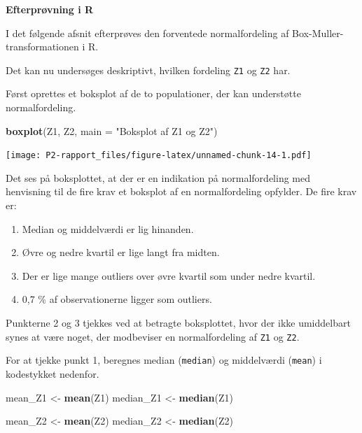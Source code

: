 \documentclass[
]{book}
\newenvironment{Shaded}{\begin{snugshade}}{\end{snugshade}}
\newcommand{\DataTypeTok}[1]{\textcolor[rgb]{0.13,0.29,0.53}{#1}}
\newcommand{\KeywordTok}[1]{\textcolor[rgb]{0.13,0.29,0.53}{\textbf{#1}}}
\newcommand{\NormalTok}[1]{#1}
\newcommand{\StringTok}[1]{\textcolor[rgb]{0.31,0.60,0.02}{#1}}
\theoremstyle{definition}
\theoremstyle{definition}
\theoremstyle{definition}
\theoremstyle{remark}
\begin{document}
\textbf{Efterprøvning i R}

I det følgende afsnit efterprøves den forventede normalfordeling af Box-Muller-transformationen i R.

Det kan nu undersøges deskriptivt, hvilken fordeling \texttt{Z1} og \texttt{Z2} har.

Først oprettes et boksplot af de to populationer, der kan understøtte normalfordeling.

\begin{Shaded}
\begin{Highlighting}[]
\KeywordTok{boxplot}\NormalTok{(Z1, Z2, }\DataTypeTok{main =} \StringTok{"Boksplot af Z1 og Z2"}\NormalTok{)}
\end{Highlighting}
\end{Shaded}

\texttt{[image: P2-rapport\_files/figure-latex/unnamed-chunk-14-1.pdf]}

Det ses på boksplottet, at der er en indikation på normalfordeling med henvisning til de fire krav et boksplot af en normalfordeling opfylder. De fire krav er:

\begin{enumerate}
\def\labelenumi{\arabic{enumi})}
\item
  Median og middelværdi er lig hinanden.
\item
  Øvre og nedre kvartil er lige langt fra midten.
\item
  Der er lige mange outliers over øvre kvartil som under nedre kvartil.
\item
  0,7 \% af observationerne ligger som outliers.
\end{enumerate}

Punkterne 2 og 3 tjekkes ved at betragte boksplottet, hvor der ikke umiddelbart synes at være noget, der modbeviser en normalfordeling af \texttt{Z1} og \texttt{Z2}.

For at tjekke punkt 1, beregnes median (\texttt{median}) og middelværdi (\texttt{mean}) i kodestykket nedenfor.

\begin{Shaded}
\begin{Highlighting}[]
\NormalTok{mean_Z1 <-}\StringTok{ }\KeywordTok{mean}\NormalTok{(Z1)}
\NormalTok{median_Z1 <-}\StringTok{ }\KeywordTok{median}\NormalTok{(Z1)}

\NormalTok{mean_Z2 <-}\StringTok{ }\KeywordTok{mean}\NormalTok{(Z2)}
\NormalTok{median_Z2 <-}\StringTok{ }\KeywordTok{median}\NormalTok{(Z2)}
\end{Highlighting}
\end{Shaded}
\end{document}
